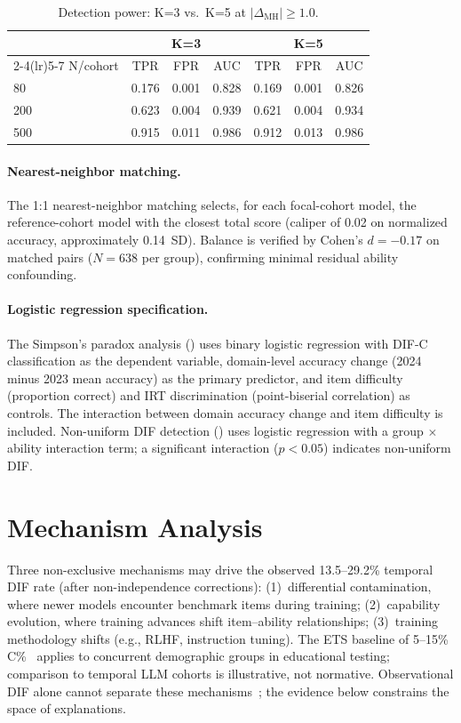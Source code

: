 \begin{table}[h]
\centering
\caption{Detection power: K=3 vs.\ K=5 at $|\Delta_{\mathrm{MH}}| \geq 1.0$.}
\label{tab:k3_power}
\small
\begin{tabular}{lcccccc}
\toprule
& \multicolumn{3}{c}{K=3} & \multicolumn{3}{c}{K=5} \\
\cmidrule(lr){2-4}\cmidrule(lr){5-7}
N/cohort & TPR & FPR & AUC & TPR & FPR & AUC \\
\midrule
80  & 0.176 & 0.001 & 0.828 & 0.169 & 0.001 & 0.826 \\
200 & 0.623 & 0.004 & 0.939 & 0.621 & 0.004 & 0.934 \\
500 & 0.915 & 0.011 & 0.986 & 0.912 & 0.013 & 0.986 \\
\bottomrule
\end{tabular}
\end{table}

\paragraph{Nearest-neighbor matching.} The 1:1 nearest-neighbor matching selects, for each focal-cohort model, the reference-cohort model with the closest total score (caliper of 0.02 on normalized accuracy, approximately 0.14~SD). Balance is verified by Cohen's $d = -0.17$ on matched pairs ($N = 638$ per group), confirming minimal residual ability confounding.

\paragraph{Logistic regression specification.} The Simpson's paradox analysis () uses binary logistic regression with DIF-C classification as the dependent variable, domain-level accuracy change (2024 minus 2023 mean accuracy) as the primary predictor, and item difficulty (proportion correct) and IRT discrimination (point-biserial correlation) as controls. The interaction between domain accuracy change and item difficulty is included. Non-uniform DIF detection () uses logistic regression with a group $\times$ ability interaction term; a significant interaction ($p < 0.05$) indicates non-uniform DIF.

\section{Mechanism Analysis}
\label{app:mechanism_discussion}

Three non-exclusive mechanisms may drive the observed 13.5--29.2\% temporal DIF rate (after non-independence corrections): (1)~differential contamination, where newer models encounter benchmark items during training; (2)~capability evolution, where training advances shift item--ability relationships; (3)~training methodology shifts (e.g., RLHF, instruction tuning). The ETS baseline of 5--15\% C\%~\citep{clauser1998dif} applies to concurrent demographic groups in educational testing; comparison to temporal LLM cohorts is illustrative, not normative. Observational DIF alone cannot separate these mechanisms~\citep{suk2026rethinking}; the evidence below constrains the space of explanations.

